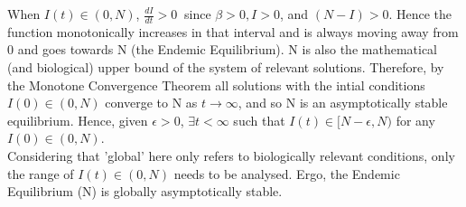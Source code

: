 

When $I(t) \in (0,N)$,  $\frac{dI}{dt} >0\ $ since $\beta >0, I >0$, and $(N-I) >0$. 
Hence the function monotonically increases in that interval and is always moving away from 0 and goes towards N (the Endemic Equilibrium). 
N is also the mathematical (and biological) upper bound of the system of relevant solutions. 
Therefore, by the Monotone Convergence Theorem all solutions with the intial conditions $I(0) \in (0,N)$ converge to N as $t\to\infty$, and so N is an asymptotically stable equilibrium. 
Hence, given $\epsilon>0$, $\exists t<\infty$ such that $I(t) \in [N-\epsilon, N)$ for any $I(0) \in (0,N)$.\\
Considering that 'global' here only refers to biologically relevant conditions, only the range of $I(t) \in (0,N)$ needs to be analysed. 
Ergo, the Endemic Equilibrium (N) is globally asymptotically stable.


